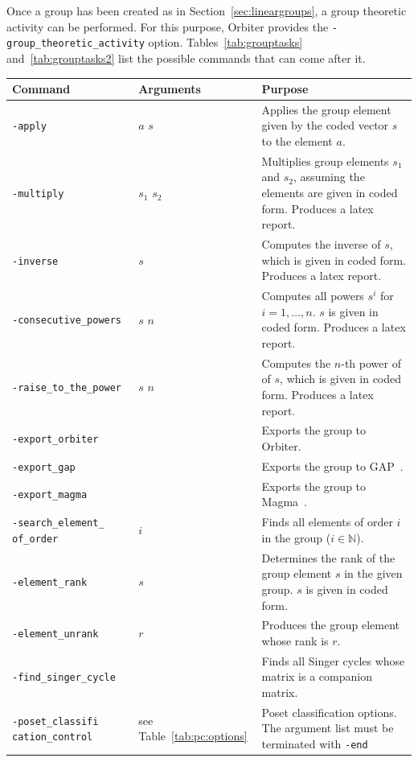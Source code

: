 Once a group has been created as in Section~\ref{sec:lineargroups}, 
a group theoretic activity can be performed.  
For this purpose, Orbiter provides the \verb'-group_theoretic_activity' option. 
Tables~\ref{tab:grouptasks} and~\ref{tab:grouptasks2} 
list the possible commands that can come after it. 
\begin{table}
\begin{center}
\begin{tabular}{|p{4cm}|p{3cm}|p{8cm}|}
\hline
Command & Arguments & Purpose \\
\hline
\hline
\verb'-apply' & $a$ $s$ & 
Applies the group element given by the coded vector $s$ to the element $a$. \\
\hline
\verb'-multiply' & $s_1$ $s_2$ & 
Multiplies group elements $s_1$ and $s_2$, assuming the elements are given in coded form. Produces a latex report. \\
\hline
\verb'-inverse' & $s$ & 
Computes the inverse of $s$, which is given in coded form. Produces a latex report. \\
\hline
\verb'-consecutive_powers' & $s$ $n$ & 
Computes all powers $s^i$ for $i=1,\ldots,n.$ $s$ is given in coded form. Produces a latex report. \\
\hline
\verb'-raise_to_the_power' & $s$ $n$ & 
Computes the $n$-th power of of $s$, which is given in coded form. Produces a latex report. \\
\hline
\verb'-export_orbiter' &  & 
Exports the group to Orbiter. \\
\hline
\verb'-export_gap' &  & 
Exports the group to GAP~\cite{GAP}. \\
\hline
\verb'-export_magma' &  & 
Exports the group to Magma~\cite{Magma}. \\
\hline
\verb'-search_element_' \verb'of_order' & $i$ & 
Finds all elements of order $i$ in the group ($i \in {\mathbb N}$). \\
\hline
\verb'-element_rank' & $s$ & 
Determines the rank of the group element $s$ in the given group. $s$ is given in coded form.\\
\hline
\verb'-element_unrank' & $r$ & 
Produces the group element whose rank is $r$. \\
\hline
\verb'-find_singer_cycle' &  & 
Finds all Singer cycles whose matrix is a companion matrix. \\
\hline
\verb'-poset_classifi' \verb'cation_control' & see Table~\ref{tab:pc:options} & 
Poset classification options. The argument list must be terminated with \verb'-end' \\

\end{tabular}
\end{center}
\end{table}
